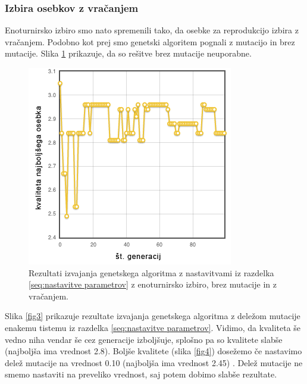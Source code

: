\documentclass[a4paper, 12pt]{book}
\begin{document}
\subsubsection{Izbira osebkov z vra\v canjem}
Enoturnirsko izbiro smo nato spremenili tako, da osebke za reprodukcijo izbira z vra\v canjem. Podobno kot prej smo genetski algoritem pognali z mutacijo in brez mutacije. Slika \ref{enotur brez mutacije} prikazuje, da so re\v sitve brez mutacije neuporabne.

\begin{figure}
\centering
\includegraphics[scale=0.70]{enotur_brez_mutacije.png}
\caption{Rezultati izvajanja genetskega algoritma z nastavitvami iz razdelka \ref{seq:nastavitve parametrov} z enoturnirsko izbiro, brez mutacije in z vra\v canjem.}
\label{enotur brez mutacije}
\end{figure}

Slika \ref{fig3} prikazuje rezultate izvajanja genetskega algoritma z dele\v zom mutacije enakemu tistemu iz razdelka \ref{seq:nastavitve parametrov}. Vidimo, da kvaliteta \v se vedno niha vendar \v se cez generacije izbolj\v suje, splo\v sno pa so kvalitete slab\v se (najbolj\v sa ima vrednost 2.8). Bolj\v se kvalitete (slika \ref{fig4}) dose\v zemo \v ce nastavimo dele\v z mutacije na vrednost 0.10 (najbolj\v sa ima vrednost 2.45) . Dele\v z mutacije ne smemo nastaviti na preveliko vrednost, saj potem dobimo slab\v se rezultate.
\end{document}
